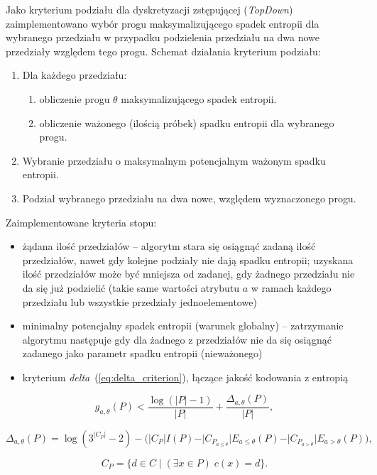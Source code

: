 
Jako kryterium podziału dla dyskretyzacji zstępującej (\emph{TopDown}) zaimplementowano wybór progu maksymalizującego spadek entropii dla wybranego przedziału w przypadku podzielenia przedziału na dwa nowe przedziały względem tego progu. Schemat działania kryterium podziału:
\begin{enumerate}
	\item{Dla każdego przedziału:}
	\begin{enumerate}
		\item{obliczenie progu $\theta$ maksymalizującego spadek entropii.}
		\item{obliczenie ważonego (ilością próbek) spadku entropii dla wybranego progu.}
	\end{enumerate}
	\item{Wybranie przedziału o maksymalnym potencjalnym ważonym spadku entropii.}
	\item{Podział wybranego przedziału na dwa nowe, względem wyznaczonego progu.}
\end{enumerate}
Zaimplementowane kryteria stopu:
\begin{itemize}
	\item{żądana ilość przedziałów -- algorytm stara się osiągnąć zadaną ilość przedziałów, nawet gdy kolejne podziały nie dają spadku entropii; uzyskana ilość przedziałów może być mniejsza od zadanej, gdy żadnego przedziału nie da się już podzielić (takie same wartości atrybutu $a$ w ramach każdego przedziału lub wszystkie przedziały jednoelementowe)}
	\item{minimalny potencjalny spadek entropii (warunek globalny) -- zatrzymanie algorytmu następuje gdy dla żadnego z przedziałów nie da się osiągnąć zadanego jako parametr spadku entropii (nieważonego)}
	\item{kryterium \emph{delta}~(\ref{eq:delta_criterion}), łączące jakość kodowania z entropią~\cite{cichosz2000systemy}}
\end{itemize}

\begin{equation}
\displaystyle g_{a,\theta}(P) < \frac{\log(\vert P\vert-1)}{\vert P\vert}+ \frac{\Delta_{a,\theta}(P)}{\vert P\vert},
\label{eq:delta_criterion}
\end{equation}

\begin{equation}
\displaystyle \Delta_{a,\theta}(P) = \log(3^{\vert C_P\vert}-2) - \big(\vert C_P\vert I(P) - \vert C_{P_{a\leq\theta}}\vert E_{a\leq\theta}(P) - \vert C_{P_{a>\theta}}\vert E_{a>\theta}(P)\big),
\end{equation}

\begin{equation}
\displaystyle C_P = \{d\in C \;\vert\; (\exists x\in P)\;c(x)=d\}.
\end{equation}

